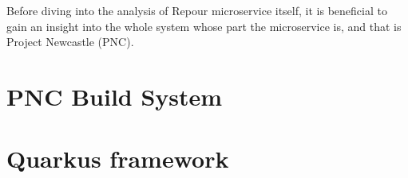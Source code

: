 \documentclass[../../main.tex]{subfiles}
\begin{document}
Before diving into the analysis of Repour microservice itself, it is beneficial to gain an insight into the whole system whose part the microservice is, and that is Project Newcastle (PNC).

\section{PNC Build System}
\label{section:pnc}


\section{Quarkus framework}

\end{document}
